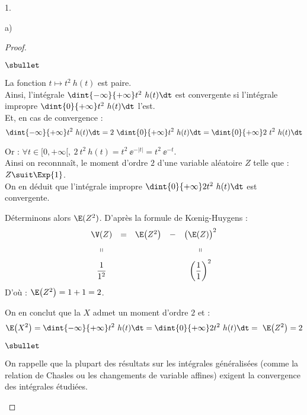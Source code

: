 \documentclass[11pt]{article}%
\begin{document}
\begin{noliste}{1.}
\begin{noliste}{a)}
\begin{proof}
\begin{noliste}{$\sbullet$}
      \item La fonction $t \mapsto t^2 \ h(t)$ est paire.\\[.2cm]
        Ainsi, l'intégrale $\dint{-\infty}{+\infty} t^2 \ h(t) \dt$
        est convergente si l'intégrale impropre $\dint{0}{+\infty} t^2
        \ h(t) \dt$ l'est.\\[.2cm]
        Et, en cas de convergence :
        \[
        \dint{-\infty}{+\infty} t^2 \ h(t) \dt = 2 \ \dint{0}{+\infty}
        t^2 \ h(t) \dt = \dint{0}{+\infty} 2 \ t^2 \ h(t) \dt
        \]

      \item Or : $\forall t \in [0, +\infty[, \ 2 \ t^2 \ h(t) = t^2 \
        \ee^{-|t|} = t^2 \ \ee^{-t}$.\\
        Ainsi on reconnnaît, le moment d'ordre $2$ d'une variable
        aléatoire $Z$ telle que : $Z \suit \Exp{1}$.\\[.1cm]
        On en déduit que l'intégrale impropre $\dint{0}{+\infty} 2 t^2
        \ h(t) \dt$ est convergente.

      \item Déterminons alors $\E(Z^2)$. D'après la formule de
        K\oe{}nig-Huygens :
        \[
        \begin{array}{ccccc}
          \V(Z) & = & \E\big( Z^2 \big) & - & \big( \E(Z) \big)^2 
          \\[.2cm]
          \shortparallel & & & & \shortparallel
          \\[.2cm]
          \dfrac{1}{1^2} & & & & \left( \dfrac{1}{1} \right)^2
        \end{array}
        \]
        D'où : $\E\big( Z^2 \big) = 1 + 1 = 2$.

      \item On en conclut que la \var $X$ admet un moment d'ordre $2$
        et :
        \[
        \E\big( X^2 \big) = \dint{-\infty}{+\infty} t^2 \ h(t) \dt =
        \dint{0}{+\infty} 2 t^2 \ h(t) \dt = \ \E\big( Z^2 \big) = 2
        \]
      \end{noliste}
      \begin{remark}%
        \begin{noliste}{$\sbullet$}
        \item On rappelle que la plupart des résultats sur les
          intégrales généralisées (comme la relation de Chasles ou les
          changements de variable affines) exigent la convergence des
          intégrales étudiées.


\end{noliste}
\end{remark}
\end{proof}
\end{noliste}
\end{noliste}
\end{document}
